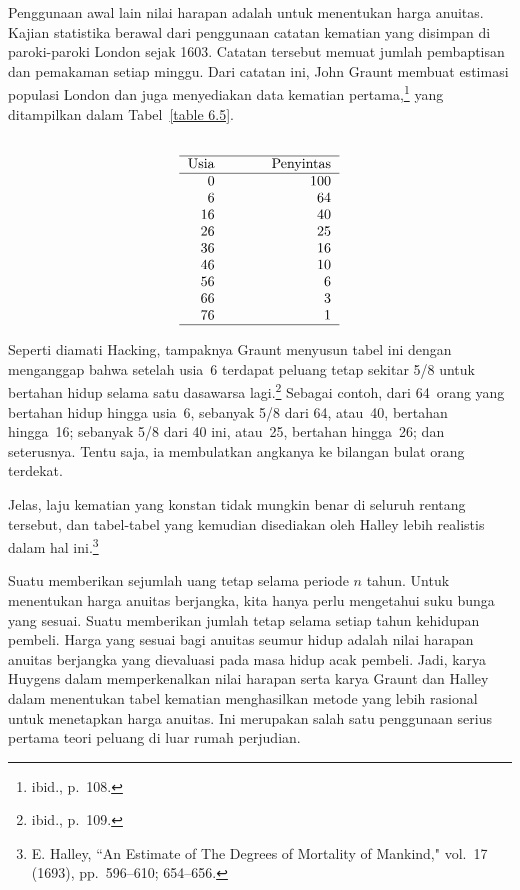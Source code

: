 Penggunaan awal lain nilai harapan adalah untuk menentukan harga
anuitas. Kajian statistika berawal dari penggunaan catatan kematian yang
disimpan di paroki-paroki London sejak 1603. Catatan tersebut memuat jumlah pembaptisan
dan pemakaman setiap minggu. Dari catatan ini, John Graunt membuat
estimasi populasi London dan juga menyediakan data kematian pertama,\footnote{ibid., p.~108.} yang ditampilkan dalam Tabel~\ref{table 6.5}.
\begin{table}
\centering
$$ 
\begin{tabular}{rr}
    & \\ \hline
 Usia &\hspace{.35in} Penyintas  \\ \hline
 0    &  100  \\
 6    &   64  \\ 16    &   40  \\ 26    &   25  \\ 36    &   16  \\ 46    &   10  \\
56    &    6  \\ 66    &    3  \\ 76    &    1  \\ \hline
\end{tabular}$$
\caption{Data kematian Graunt.}
\label{table 6.5}
\end{table}

Seperti diamati Hacking, tampaknya Graunt menyusun tabel ini dengan menganggap bahwa
setelah usia~6 terdapat peluang tetap sekitar 5/8 untuk bertahan hidup selama satu
dasawarsa lagi.\footnote{ibid., p.~109.} Sebagai contoh, dari 64~orang yang bertahan
hidup hingga usia~6, sebanyak 5/8 dari 64, atau~40, bertahan hingga~16; sebanyak 5/8
dari 40 ini, atau~25, bertahan hingga~26; dan seterusnya. Tentu saja, ia membulatkan
angkanya ke bilangan bulat orang terdekat.

Jelas, laju kematian yang konstan tidak mungkin benar di seluruh rentang tersebut, dan
tabel-tabel yang kemudian disediakan oleh Halley lebih realistis dalam hal
ini.\footnote{E.
Halley, ``An Estimate of The Degrees of Mortality of Mankind,"  vol.~17 (1693), pp.~596--610; 654--656.}

Suatu  memberikan sejumlah uang tetap
selama periode $n$ tahun. Untuk menentukan harga anuitas berjangka, kita hanya perlu
mengetahui suku bunga yang sesuai. Suatu \emx {anuitas seumur hidup}\index{anuitas!seumur
hidup} memberikan jumlah tetap selama setiap tahun kehidupan pembeli. Harga yang
sesuai bagi anuitas seumur hidup adalah nilai harapan anuitas berjangka yang dievaluasi
pada masa hidup acak pembeli. Jadi, karya Huygens dalam memperkenalkan nilai harapan
serta karya Graunt dan Halley dalam menentukan tabel kematian menghasilkan metode yang
lebih rasional untuk menetapkan harga anuitas. Ini merupakan salah satu penggunaan
serius pertama teori peluang di luar rumah perjudian.

